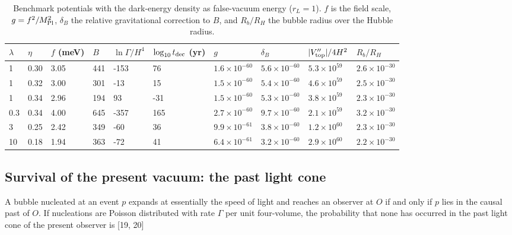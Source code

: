 \documentclass[11pt,a4paper]{article}
\begin{document}
\begin{table}[htbp]\centering\small
\caption{Benchmark potentials with the dark-energy density as false-vacuum energy ($r_L=1$). $f$ is the field scale, $g=f^2/M_{\rm Pl}^2$, $\delta_B$ the relative gravitational correction to $B$, and $R_b/R_H$ the bubble radius over the Hubble radius.}
\begin{tabular}{llllllllll}
\toprule
$\lambda$ & $\eta$ & $f$ (meV) & $B$ & $\ln\Gamma/H^4$ & $\log_{10}t_{\rm dec}$ (yr) & $g$ & $\delta_B$ & $|V''_{\rm top}|/4H^2$ & $R_b/R_H$ \\ \midrule
1 & 0.30 & 3.05 & 441 & -153 & 76 & $1.6\times10^{-60}$ & $5.6\times10^{-60}$ & $5.3\times10^{59}$ & $2.6\times10^{-30}$ \\
1 & 0.32 & 3.00 & 301 & -13 & 15 & $1.5\times10^{-60}$ & $5.4\times10^{-60}$ & $4.6\times10^{59}$ & $2.5\times10^{-30}$ \\
1 & 0.34 & 2.96 & 194 & 93 & -31 & $1.5\times10^{-60}$ & $5.3\times10^{-60}$ & $3.8\times10^{59}$ & $2.3\times10^{-30}$ \\
0.3 & 0.34 & 4.00 & 645 & -357 & 165 & $2.7\times10^{-60}$ & $9.7\times10^{-60}$ & $2.1\times10^{59}$ & $3.2\times10^{-30}$ \\
3 & 0.25 & 2.42 & 349 & -60 & 36 & $9.9\times10^{-61}$ & $3.8\times10^{-60}$ & $1.2\times10^{60}$ & $2.3\times10^{-30}$ \\
10 & 0.18 & 1.94 & 363 & -72 & 41 & $6.4\times10^{-61}$ & $3.2\times10^{-60}$ & $2.9\times10^{60}$ & $2.2\times10^{-30}$ \\
\bottomrule
\end{tabular}
\end{table}
\subsection{Survival of the present vacuum: the past light cone}
A bubble nucleated at an event $p$ expands at essentially the speed of light and reaches an observer at $O$ if and only if $p$ lies in the causal past of $O$. If nucleations are Poisson distributed with rate $\Gamma$ per unit four-volume, the probability that none has occurred in the past light cone of the present observer is [19, 20]
\end{document}
